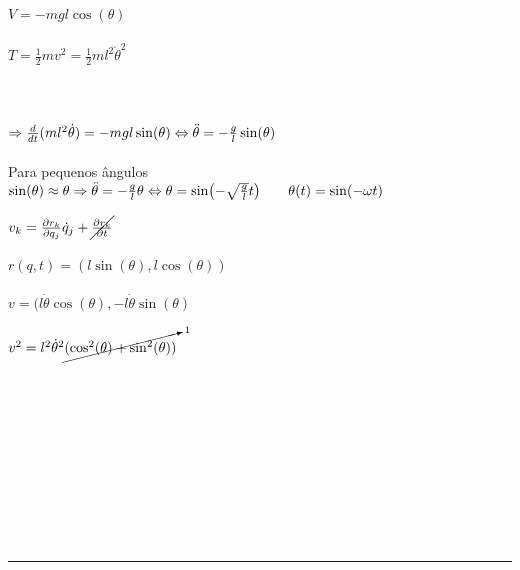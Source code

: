\begin{minipage}[t]{0.6\textwidth}

$V=-mgl \cos (\theta)$\\
\\
$T=\frac{1}{2}mv^{2}=\frac{1}{2}ml^2 \dot \theta^2$\\
\\
\\
\\
$
\Rightarrow \frac{d}{dt} (ml^2 \dot \theta)=-mgl \sin (\theta)\\
\\
\Leftrightarrow \ddot \theta=-\frac{g}{l}\sin(\theta)$\\
\\
Para pequenos ângulos $\sin(\theta)\approx\theta\\
\\
\Rightarrow \ddot \theta=-\frac{g}{l}\theta \\
\\
\Leftrightarrow \theta=\sin(-\sqrt{\frac{g}{l}}t) \qquad \theta(t)=\sin(-\omega t)
$
\end{minipage}
\begin{minipage}[t]{0.5\textwidth}
$v_k=\frac{\partial r_k}{\partial q_j}\dot q_j + \cancel{\frac{\partial r_k}{\partial t}}$\\
\\
$r(q,t)=(l\sin(\theta),l\cos(\theta))$\\
\\
$v=(l\dot \theta \cos(\theta), -l \dot \theta \sin(\theta)$

$v^2=l^2 \dot \theta^2 \cancelto{1}{(\cos^2(\theta)+\sin^2(\theta))}$\\
\\
\\
\\ \\ \\ \\ \\
\end{minipage}
\\
\\
\hrule
